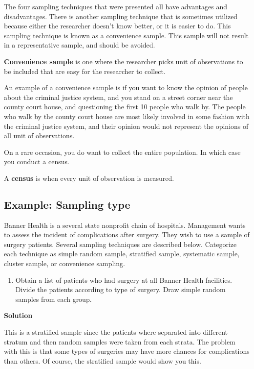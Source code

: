 \documentclass[
]{book}
\providecommand{\tightlist}{%
  \setlength{\itemsep}{0pt}\setlength{\parskip}{0pt}}
\begin{document}
The four sampling techniques that were presented all have advantages and disadvantages. There is another sampling technique that is sometimes utilized because either the researcher doesn't know better, or it is easier to do. This sampling technique is known as a convenience sample. This sample will not result in a representative sample, and should be avoided.

\textbf{Convenience sample} is one where the researcher picks unit of observations to be included that are easy for the researcher to collect.

An example of a convenience sample is if you want to know the opinion of people about the criminal justice system, and you stand on a street corner near the county court house, and questioning the first 10 people who walk by. The people who walk by the county court house are most likely involved in some fashion with the criminal justice system, and their opinion would not represent the opinions of all unit of observations.

On a rare occasion, you do want to collect the entire population. In which case you conduct a census.

A \textbf{census} is when every unit of observation is measured.

\hypertarget{example-sampling-type}{%
\subsection{Example: Sampling type}\label{example-sampling-type}}

Banner Health is a several state nonprofit chain of hospitals. Management wants to assess the incident of complications after surgery. They wish to use a sample of surgery patients. Several sampling techniques are described below. Categorize each technique as simple random sample, stratified sample, systematic sample, cluster sample, or convenience sampling.

\begin{enumerate}
\def\labelenumi{\alph{enumi}.}
\tightlist
\item
  Obtain a list of patients who had surgery at all Banner Health
  facilities. Divide the patients according to type of surgery. Draw
  simple random samples from each group.
\end{enumerate}

\textbf{Solution}

This is a stratified sample since the patients where separated into
different stratum and then random samples were taken from each
strata. The problem with this is that some types of surgeries may
have more chances for complications than others. Of course, the
stratified sample would show you this.
\end{document}
